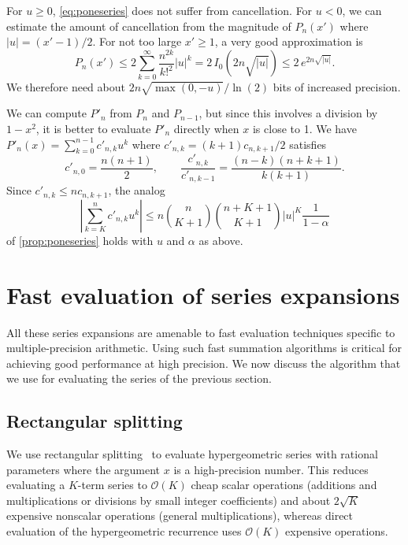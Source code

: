 \documentclass[nohypdvips,review]{siamart0216}
\newcommand{\OO}{\mathcal{O}}
\begin{document}
For $u \ge 0$, \cref{eq:poneseries} does not suffer from cancellation.
For $u < 0$, we can estimate the amount of
cancellation from the magnitude of $P_n(x')$ where $|u| = (x'-1)/2$.
For not too large $x' \ge 1$, a very good approximation is
\[ P_n(x') \leq 2 \sum_{k=0}^{\infty} \frac{n^{2k}}{k!^2} |u|^k
           = 2\,I_0(2n\sqrt{|u|})
           \leq 2\,e^{2n\sqrt{|u|}}. \]
We therefore need about $2n\sqrt{\max(0,-u)} / \ln(2)$ bits
of increased precision.

We can compute $P'_n$ from $P_n$ and $P_{n-1}$, but since this
involves a division by $1-x^2$, it is better to
evaluate $P'_n$ directly when $x$ is close to 1.
We have
$P'_n(x) = \sum_{k=0}^{n-1} c'_{n,k} u^k$
where $c'_{n,k} = (k+1) c_{n,k+1} / 2$ satisfies
\begin{equation}
\label{eq:ponerecprime}
  c'_{n,0} = \frac{n(n+1)}{2}, \qquad
  \frac{c'_{n,k}}{c'_{n,k-1}} = \frac{(n-k)(n+k+1)}{k(k+1)}.
\end{equation}
Since $c'_{n,k} \le n c_{n,k+1}$, the analog
\begin{equation}
\label{eq:truncerr2b}
\left| \sum_{k=K}^n c'_{n,k} u^k \right| \le n {n \choose K+1}{n+K+1 \choose K+1} |u|^K \frac{1}{1-\alpha}
\end{equation}
of \cref{prop:poneseries} holds with $u$ and $\alpha$ as above.

\section{Fast evaluation of series expansions}

\label{sec:eval}

All these series expansions are amenable to fast evaluation techniques
specific to multiple-precision arithmetic. Using such fast summation
algorithms is critical for achieving good performance at high precision.
We now discuss the algorithm that we use for evaluating the series of
the previous section.

\subsection{Rectangular splitting}

\label{sec:serieseval}

We use rectangular splitting~\cite{Smith1989,Johansson2014rectangular}
to evaluate hypergeometric series with
rational parameters where the argument $x$ is a high-precision number.
This reduces evaluating a $K$-term series to
$\OO(K)$ cheap scalar operations (additions and multiplications or divisions
by small integer coefficients)
and about $2\sqrt{K}$ expensive nonscalar operations (general multiplications),
whereas direct evaluation of the hypergeometric
recurrence uses $\OO(K)$ expensive operations.
\end{document}

